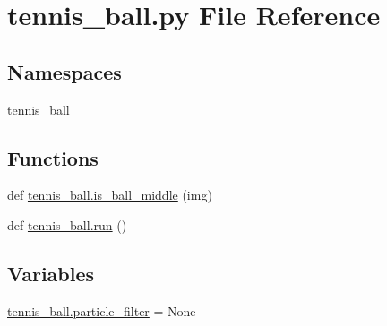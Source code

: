 \section{tennis\+\_\+ball.\+py File Reference}
\label{tennis__ball_8py}
\subsection*{Namespaces}
\begin{DoxyCompactItemize}
\item 
 \hyperlink{namespacetennis__ball}{tennis\+\_\+ball}
\end{DoxyCompactItemize}
\subsection*{Functions}
\begin{DoxyCompactItemize}
\item 
def \hyperlink{namespacetennis__ball_a595850f165f1ae2c78218d580854bfda}{tennis\+\_\+ball.\+is\+\_\+ball\+\_\+middle} (img)
\item 
def \hyperlink{namespacetennis__ball_af2aced0030d28f7b0b98175dd3a3d97c}{tennis\+\_\+ball.\+run} ()
\end{DoxyCompactItemize}
\subsection*{Variables}
\begin{DoxyCompactItemize}
\item 
\hyperlink{namespacetennis__ball_aba3913b89ed8c5fae700b6dfbca98f05}{tennis\+\_\+ball.\+particle\+\_\+filter} = None
\end{DoxyCompactItemize}
